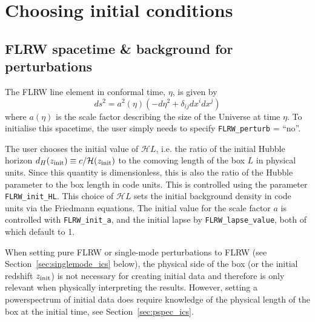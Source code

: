 \section{Choosing initial conditions}
\label{sec:eqn}

\subsection{FLRW spacetime \& background for perturbations} \label{sec:FLRWinit}

The FLRW line element in conformal time, $\eta$, is given by
\begin{equation}
	ds^2 = a^2(\eta) \left( - d\eta^2 + \delta_{ij}dx^i dx^j \right)
\end{equation}
where $a(\eta)$ is the scale factor describing the size of the Universe at time $\eta$. To initialise this spacetime, the user simply needs to specify \texttt{FLRW\_perturb} = ``no''. 

The user chooses the initial value of $\mathcal{H}L$, i.e. the ratio of the initial Hubble horizon $d_H(z_{\rm init})\equiv c/\mathcal{H}(z_{\rm init})$ to the comoving length of the box $L$ in physical units. Since this quantity is dimensionless, this is also the ratio of the Hubble parameter to the box length in code units. This is controlled using the parameter \texttt{FLRW\_init\_HL}. 
This choice of $\mathcal{H}L$ sets the initial background density in code units via the Friedmann equations. The initial value for the scale factor $a$ is controlled with \texttt{FLRW\_init\_a}, and the initial lapse by \texttt{FLRW\_lapse\_value}, both of which default to 1. 

When setting pure FLRW or single-mode perturbations to FLRW (see Section~\ref{sec:singlemode_ics} below), the physical side of the box (or the initial redshift $z_{\rm init}$) is not necessary for creating initial data and therefore is only relevant when physically interpreting the results. However, setting a powerspectrum of initial data does require knowledge of the physical length of the box at the initial time, see Section~\ref{sec:pspec_ics}.


